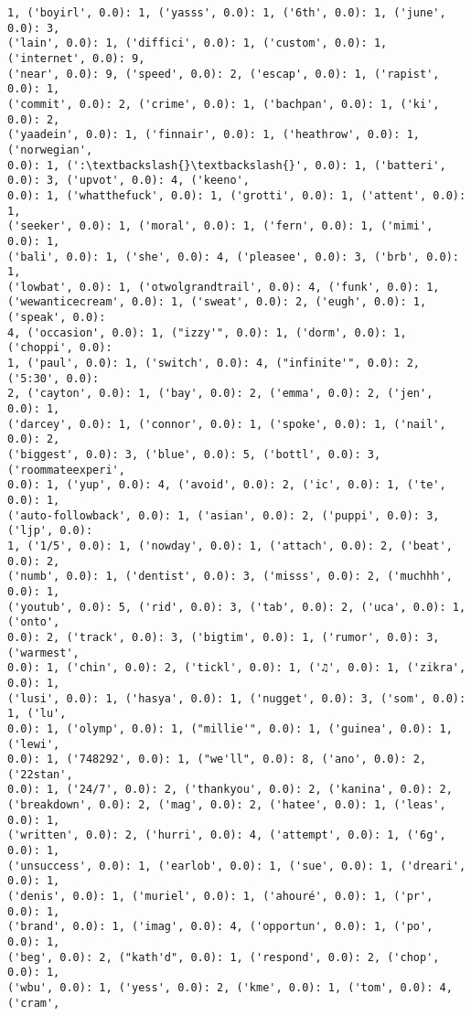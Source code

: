 \documentclass[11pt]{article}
\begin{document}
\begin{Verbatim}[commandchars=\\\{\}]
1, ('boyirl', 0.0): 1, ('yasss', 0.0): 1, ('6th', 0.0): 1, ('june', 0.0): 3,
('lain', 0.0): 1, ('diffici', 0.0): 1, ('custom', 0.0): 1, ('internet', 0.0): 9,
('near', 0.0): 9, ('speed', 0.0): 2, ('escap', 0.0): 1, ('rapist', 0.0): 1,
('commit', 0.0): 2, ('crime', 0.0): 1, ('bachpan', 0.0): 1, ('ki', 0.0): 2,
('yaadein', 0.0): 1, ('finnair', 0.0): 1, ('heathrow', 0.0): 1, ('norwegian',
0.0): 1, (':\textbackslash{}\textbackslash{}', 0.0): 1, ('batteri', 0.0): 3, ('upvot', 0.0): 4, ('keeno',
0.0): 1, ('whatthefuck', 0.0): 1, ('grotti', 0.0): 1, ('attent', 0.0): 1,
('seeker', 0.0): 1, ('moral', 0.0): 1, ('fern', 0.0): 1, ('mimi', 0.0): 1,
('bali', 0.0): 1, ('she', 0.0): 4, ('pleasee', 0.0): 3, ('brb', 0.0): 1,
('lowbat', 0.0): 1, ('otwolgrandtrail', 0.0): 4, ('funk', 0.0): 1,
('wewanticecream', 0.0): 1, ('sweat', 0.0): 2, ('eugh', 0.0): 1, ('speak', 0.0):
4, ('occasion', 0.0): 1, ("izzy'", 0.0): 1, ('dorm', 0.0): 1, ('choppi', 0.0):
1, ('paul', 0.0): 1, ('switch', 0.0): 4, ("infinite'", 0.0): 2, ('5:30', 0.0):
2, ('cayton', 0.0): 1, ('bay', 0.0): 2, ('emma', 0.0): 2, ('jen', 0.0): 1,
('darcey', 0.0): 1, ('connor', 0.0): 1, ('spoke', 0.0): 1, ('nail', 0.0): 2,
('biggest', 0.0): 3, ('blue', 0.0): 5, ('bottl', 0.0): 3, ('roommateexperi',
0.0): 1, ('yup', 0.0): 4, ('avoid', 0.0): 2, ('ic', 0.0): 1, ('te', 0.0): 1,
('auto-followback', 0.0): 1, ('asian', 0.0): 2, ('puppi', 0.0): 3, ('ljp', 0.0):
1, ('1/5', 0.0): 1, ('nowday', 0.0): 1, ('attach', 0.0): 2, ('beat', 0.0): 2,
('numb', 0.0): 1, ('dentist', 0.0): 3, ('misss', 0.0): 2, ('muchhh', 0.0): 1,
('youtub', 0.0): 5, ('rid', 0.0): 3, ('tab', 0.0): 2, ('uca', 0.0): 1, ('onto',
0.0): 2, ('track', 0.0): 3, ('bigtim', 0.0): 1, ('rumor', 0.0): 3, ('warmest',
0.0): 1, ('chin', 0.0): 2, ('tickl', 0.0): 1, ('♫', 0.0): 1, ('zikra', 0.0): 1,
('lusi', 0.0): 1, ('hasya', 0.0): 1, ('nugget', 0.0): 3, ('som', 0.0): 1, ('lu',
0.0): 1, ('olymp', 0.0): 1, ("millie'", 0.0): 1, ('guinea', 0.0): 1, ('lewi',
0.0): 1, ('748292', 0.0): 1, ("we'll", 0.0): 8, ('ano', 0.0): 2, ('22stan',
0.0): 1, ('24/7', 0.0): 2, ('thankyou', 0.0): 2, ('kanina', 0.0): 2,
('breakdown', 0.0): 2, ('mag', 0.0): 2, ('hatee', 0.0): 1, ('leas', 0.0): 1,
('written', 0.0): 2, ('hurri', 0.0): 4, ('attempt', 0.0): 1, ('6g', 0.0): 1,
('unsuccess', 0.0): 1, ('earlob', 0.0): 1, ('sue', 0.0): 1, ('dreari', 0.0): 1,
('denis', 0.0): 1, ('muriel', 0.0): 1, ('ahouré', 0.0): 1, ('pr', 0.0): 1,
('brand', 0.0): 1, ('imag', 0.0): 4, ('opportun', 0.0): 1, ('po', 0.0): 1,
('beg', 0.0): 2, ("kath'd", 0.0): 1, ('respond', 0.0): 2, ('chop', 0.0): 1,
('wbu', 0.0): 1, ('yess', 0.0): 2, ('kme', 0.0): 1, ('tom', 0.0): 4, ('cram',

\end{Verbatim}
\end{document}

